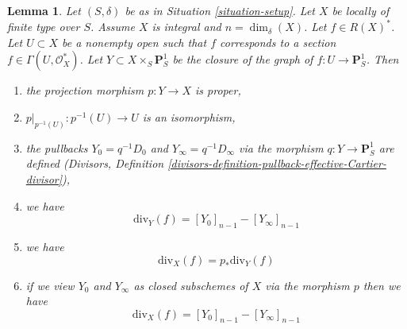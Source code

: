 \documentclass[10pt,a4paper]{amsart}
\theoremstyle{plain}
\newtheorem{lemma}[subsection]{Lemma}
\theoremstyle{definition}
\theoremstyle{remark}
\numberwithin{equation}{subsection}
\begin{document}
\begin{lemma}
\label{lemma-rational-function}
Let $(S, \delta)$ be as in Situation \ref{situation-setup}.
Let $X$ be locally of finite type over $S$. Assume $X$ is
integral and $n = \dim_\delta(X)$. Let $f \in R(X)^*$.
Let $U \subset X$ be a nonempty open such that $f$
corresponds to a section $f \in \Gamma(U, \mathcal{O}_X^*)$.
Let $Y \subset X \times_S \mathbf{P}^1_S$ be the
closure of the graph of $f : U \to \mathbf{P}^1_S$.
Then
\begin{enumerate}
\item the projection morphism $p : Y \to X$ is proper,
\item $p|_{p^{-1}(U)} : p^{-1}(U) \to U$ is an isomorphism,
\item the pullbacks $Y_0 = q^{-1}D_0$ and $Y_\infty = q^{-1}D_\infty$
via the morphism $q : Y \to \mathbf{P}^1_S$ are defined
(Divisors, Definition
\ref{divisors-definition-pullback-effective-Cartier-divisor}),
\item we have
$$
\text{div}_Y(f) = [Y_0]_{n - 1} - [Y_\infty]_{n - 1}
$$
\item we have
$$
\text{div}_X(f) = p_*\text{div}_Y(f)
$$
\item if we view $Y_0$ and $Y_\infty$ as closed subschemes of $X$
via the morphism $p$ then we have
$$
\text{div}_X(f) = [Y_0]_{n - 1} - [Y_\infty]_{n - 1}
$$
\end{enumerate}
\end{lemma}
\end{document}
